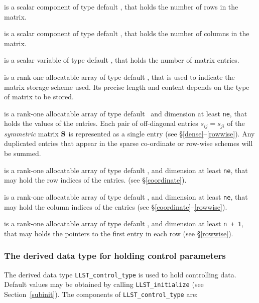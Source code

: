 \documentclass{galahad}
\newcommand{\packagename}{LLST}
\begin{document}
\begin{description}

 is a scalar component of type default \integer, 
that holds the number of rows in the matrix. 
 
 is a scalar component of type default \integer, 
that holds the number of columns in the matrix. 
 
 is a scalar variable of type default \integer, that
holds the number of matrix entries.

 is a rank-one allocatable array of type default \character, that
is used to indicate the matrix storage scheme used. Its precise length and
content depends on the type of matrix to be stored.

 is a rank-one allocatable array of type default \realdp\, 
and dimension at least {\tt ne}, that holds the values of the entries. 
Each pair of off-diagonal entries $s_{ij} = s_{ji}$ of the {\em symmetric}
matrix ${\mathbf{S}}$ is represented as a single entry 
(see \S\ref{dense}--\ref{rowwise}).
Any duplicated entries that appear in the sparse 
co-ordinate or row-wise schemes will be summed. 

 is a rank-one allocatable array of type default \integer, 
and dimension at least {\tt ne}, that may hold the row indices of the entries. 
(see \S\ref{coordinate}).

 is a rank-one allocatable array of type default \integer, 
and dimension at least {\tt ne}, that may hold the column indices of the entries
(see \S\ref{coordinate}--\ref{rowwise}).

 is a rank-one allocatable array of type default \integer, 
and dimension at least {\tt n + 1}, that may holds the pointers to
the first entry in each row (see \S\ref{rowwise}).

\end{description}


\subsubsection{The derived data type for holding control 
 parameters}\label{typecontrol}
The derived data type 
{\tt \packagename\_control\_type} 
is used to hold controlling data. Default values may be obtained by calling 
{\tt \packagename\_initialize}
(see Section~\ref{subinit}). The components of 
{\tt \packagename\_control\_type} 
are:
\end{document}

